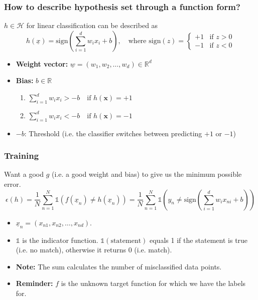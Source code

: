     \subsubsection{How to describe hypothesis set through a function form?}
    \begin{definition}
        $h \in \mathcal{H}$ for linear classification can be described as
        $$
        h(\underline{x}) = \text{sign}\left(\sum_{i=1}^{d} w_i x_i + b\right), \quad
        \text{where } \text{sign}(z) = 
        \begin{cases} 
        +1 & \text{if } z > 0 \\
        -1 & \text{if } z < 0
        \end{cases}
        $$

        \begin{itemize}
            \item \textbf{Weight vector:} $\underline{w} = (w_1, w_2, \dots, w_d) \in \mathbb{R}^d$
            \item \textbf{Bias:} $b \in \mathbb{R}$
            \begin{enumerate}
                \item $\sum_{i=1}^{d} w_i x_i > -b \quad \text{if } h(\mathbf{x}) = +1$
                \item $\sum_{i=1}^{d} w_i x_i < -b \quad \text{if } h(\mathbf{x}) = -1$
            \end{enumerate}
            \item $-b$: Threshold (i.e. the classifier switches between predicting $+1$ or $-1$)
        \end{itemize}
    \end{definition}

    \subsubsection{Training}
    \begin{definition}
        Want a good $g$ (i.e. a good weight and bias) to give us the minimum possible error.
        \[
        \epsilon (h) = \frac{1}{N} \sum_{n=1}^{N} \mathbb{1}(f(\underline{x}_n) \neq h(\underline{x}_n)) = \frac{1}{N} \sum_{n=1}^{N} \mathbb{1}\left( y_n \neq \text{sign}\left( \sum_{i=1}^{d} w_i x_{ni} + b \right) \right)
        \]
        \begin{itemize}
            \item $\underline{x}_n = (x_{n1}, x_{n2}, \dots, x_{nd})$.
            \item $\mathbb{1}$ is the indicator function. $\mathbb{1}(\text{statement})$ equals 1 if the statement is true (i.e. no match), otherwise it returns 0 (i.e. match).
            \item \textbf{Note:} The sum calculates the number of misclassified data points. 
            \item \textbf{Reminder:} $f$ is the unknown target function for which we have the labels for.
        \end{itemize}
    \end{definition}

